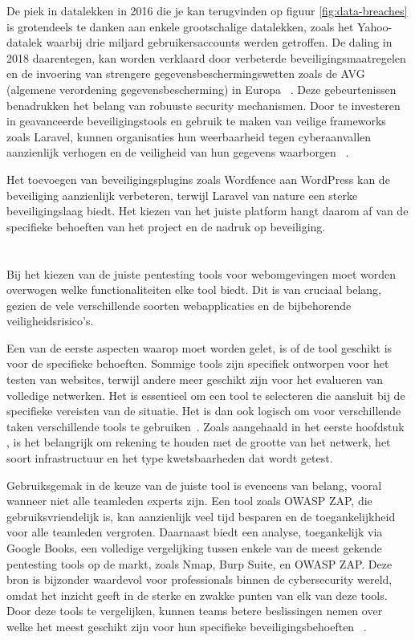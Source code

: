 De piek in datalekken in 2016 die je kan terugvinden op figuur \ref{fig:data-breaches} is grotendeels te danken aan enkele grootschalige datalekken, zoals het Yahoo-datalek waarbij 
drie miljard gebruikersaccounts werden getroffen. De daling in 2018 daarentegen, kan worden verklaard door verbeterde beveiligingsmaatregelen 
en de invoering van strengere gegevensbeschermingswetten zoals de AVG (algemene verordening gegevensbescherming) in Europa 
~\autocite{Petrosyan2024}. Deze gebeurtenissen benadrukken het belang van robuuste security mechanismen. Door te investeren 
in geavanceerde beveiligingstools en gebruik te maken van veilige frameworks zoals Laravel, kunnen organisaties hun 
weerbaarheid tegen cyberaanvallen aanzienlijk verhogen en de veiligheid van hun gegevens waarborgen ~\autocite{Petrosyan2024}.

Het toevoegen van beveiligingsplugins zoals Wordfence aan WordPress kan de beveiliging aanzienlijk verbeteren, terwijl Laravel van nature een 
sterke beveiligingslaag biedt. Het kiezen van het juiste platform hangt daarom af van de specifieke behoeften van het project en de nadruk op beveiliging.
\section{}
\label{sec:Pentesting tools}
Bij het kiezen van de juiste pentesting tools voor webomgevingen moet worden overwogen welke functionaliteiten 
elke tool biedt. Dit is van cruciaal belang, gezien de vele verschillende soorten webapplicaties en de bijbehorende veiligheidsrisico's.

Een van de eerste aspecten waarop moet worden gelet, is of de tool geschikt is voor de specifieke behoeften. Sommige tools 
zijn specifiek ontworpen voor het testen van websites, terwijl andere meer geschikt zijn voor het evalueren van volledige 
netwerken. Het is essentieel om een tool te selecteren die aansluit bij de specifieke vereisten van de situatie. Het 
is dan ook logisch om voor verschillende taken verschillende tools te gebruiken~\autocite{Deepikakongara2023}.
Zoals aangehaald in het eerste hoofdstuk , is het belangrijk om rekening te houden met de grootte van het netwerk, 
het soort infrastructuur en het type kwetsbaarheden dat wordt getest.

Gebruiksgemak in de keuze van de juiste tool is eveneens van belang, vooral wanneer niet alle teamleden experts zijn. Een tool zoals OWASP ZAP, 
die gebruiksvriendelijk is, kan aanzienlijk veel tijd besparen en de toegankelijkheid voor alle teamleden vergroten.
Daarnaast biedt een analyse, toegankelijk via Google Books, een volledige vergelijking tussen enkele van de meest gekende pentesting tools op de markt, 
zoals Nmap, Burp Suite, en OWASP ZAP. Deze bron is bijzonder waardevol voor professionals binnen de cybersecurity wereld, omdat het inzicht geeft in de sterke en zwakke 
punten van elk van deze tools. Door deze tools te vergelijken, kunnen teams betere beslissingen nemen over welke het meest geschikt zijn 
voor hun specifieke beveiligingsbehoeften ~\autocite{Velu2022}.

